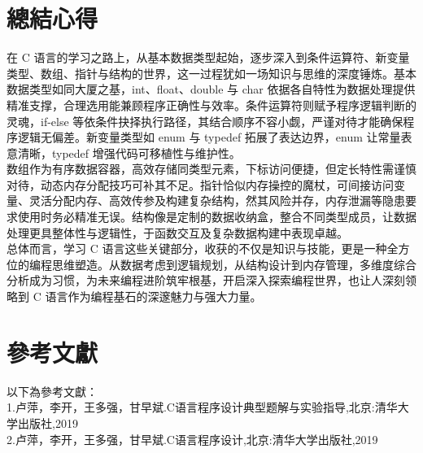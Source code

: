 \documentclass[supercite]{Experimental_Report}
\theoremstyle{definition}
\begin{document}
	
	\section{總結心得}
	在 C 语言的学习之路上，从基本数据类型起始，逐步深入到条件运算符、新变量类型、数组、指针与结构的世界，这一过程犹如一场知识与思维的深度锤炼。基本数据类型如同大厦之基，int、float、double 与 char 依据各自特性为数据处理提供精准支撑，合理选用能兼顾程序正确性与效率。条件运算符则赋予程序逻辑判断的灵魂，if-else 等依条件抉择执行路径，其结合顺序不容小觑，严谨对待才能确保程序逻辑无偏差。新变量类型如 enum 与 typedef 拓展了表达边界，enum 让常量表意清晰，typedef 增强代码可移植性与维护性。
	\\数组作为有序数据容器，高效存储同类型元素，下标访问便捷，但定长特性需谨慎对待，动态内存分配技巧可补其不足。指针恰似内存操控的魔杖，可间接访问变量、灵活分配内存、高效传参及构建复杂结构，然其风险并存，内存泄漏等隐患要求使用时务必精准无误。结构像是定制的数据收纳盒，整合不同类型成员，让数据处理更具整体性与逻辑性，于函数交互及复杂数据构建中表现卓越。
	\\总体而言，学习 C 语言这些关键部分，收获的不仅是知识与技能，更是一种全方位的编程思维塑造。从数据考虑到逻辑规划，从结构设计到内存管理，多维度综合分析成为习惯，为未来编程进阶筑牢根基，开启深入探索编程世界，也让人深刻领略到 C 语言作为编程基石的深邃魅力与强大力量。
	
	\section{參考文獻}
	以下為參考文獻：\\
    1.卢萍，李开，王多强，甘早斌.C语言程序设计典型题解与实验指导,北京:清华大学出版社,2019\\
    2.卢萍，李开，王多强，甘早斌.C语言程序设计,北京:清华大学出版社,2019
	
	
	
\end{document}
